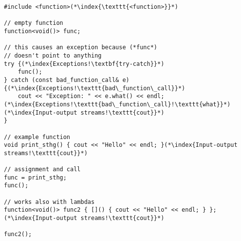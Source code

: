 \documentclass[10pt]{article}
\begin{document}
\begin{lstlisting}
#include <function>(*\index{\texttt{<function>}}*)

// empty function
function<void()> func;

// this causes an exception because (*func*) 
// doesn't point to anything
try {(*\index{Exceptions!\textbf{try-catch}}*)
    func();
} catch (const bad_function_call& e) {(*\index{Exceptions!\texttt{bad\_function\_call}}*)
    cout << "Exception: " << e.what() << endl;(*\index{Exceptions!\texttt{bad\_function\_call}!\texttt{what}}*)(*\index{Input-output streams!\texttt{cout}}*)
}

// example function
void print_sthg() { cout << "Hello" << endl; }(*\index{Input-output streams!\texttt{cout}}*)

// assignment and call
func = print_sthg;
func();

// works also with lambdas
function<void()> func2 { []() { cout << "Hello" << endl; } };(*\index{Input-output streams!\texttt{cout}}*)

func2();
\end{lstlisting}

%
%
\end{document}
